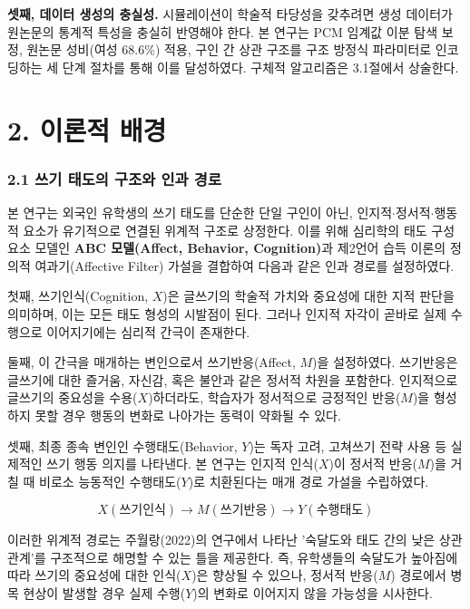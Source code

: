 \documentclass[a4paper,10pt]{oblivoir}
\begin{document}
\textbf{셋째, 데이터 생성의 충실성.} 시뮬레이션이 학술적 타당성을 갖추려면 생성 데이터가 원논문의 통계적 특성을 충실히 반영해야 한다. 본 연구는 PCM 임계값 이분 탐색 보정, 원논문 성비(여성 68.6\%) 적용, 구인 간 상관 구조를 구조 방정식 파라미터로 인코딩하는 세 단계 절차를 통해 이를 달성하였다. 구체적 알고리즘은 3.1절에서 상술한다.


\section{2. 이론적 배경}

\subsubsection{2.1 쓰기 태도의 구조와 인과 경로}

본 연구는 외국인 유학생의 쓰기 태도를 단순한 단일 구인이 아닌, 인지적\ensuremath{\cdot}정서적\ensuremath{\cdot}행동적 요소가 유기적으로 연결된 위계적 구조로 상정한다. 이를 위해 심리학의 태도 구성 요소 모델인 \textbf{ABC 모델(Affect, Behavior, Cognition)}과 제2언어 습득 이론의 정의적 여과기(Affective Filter) 가설을 결합하여 다음과 같은 인과 경로를 설정하였다.

첫째, 쓰기인식(Cognition, $X$)은 글쓰기의 학술적 가치와 중요성에 대한 지적 판단을 의미하며, 이는 모든 태도 형성의 시발점이 된다. 그러나 인지적 자각이 곧바로 실제 수행으로 이어지기에는 심리적 간극이 존재한다.

둘째, 이 간극을 매개하는 변인으로서 쓰기반응(Affect, $M$)을 설정하였다. 쓰기반응은 글쓰기에 대한 즐거움, 자신감, 혹은 불안과 같은 정서적 차원을 포함한다. 인지적으로 글쓰기의 중요성을 수용($X$)하더라도, 학습자가 정서적으로 긍정적인 반응($M$)을 형성하지 못할 경우 행동의 변화로 나아가는 동력이 약화될 수 있다.

셋째, 최종 종속 변인인 수행태도(Behavior, $Y$)는 독자 고려, 고쳐쓰기 전략 사용 등 실제적인 쓰기 행동 의지를 나타낸다. 본 연구는 인지적 인식($X$)이 정서적 반응($M$)을 거칠 때 비로소 능동적인 수행태도($Y$)로 치환된다는 매개 경로 가설을 수립하였다.

\[ X(\text{쓰기인식}) \rightarrow M(\text{쓰기반응}) \rightarrow Y(\text{수행태도}) \]

이러한 위계적 경로는 주월랑(2022)의 연구에서 나타난 '숙달도와 태도 간의 낮은 상관관계'를 구조적으로 해명할 수 있는 틀을 제공한다. 즉, 유학생들의 숙달도가 높아짐에 따라 쓰기의 중요성에 대한 인식($X$)은 향상될 수 있으나, 정서적 반응($M$) 경로에서 병목 현상이 발생할 경우 실제 수행($Y$)의 변화로 이어지지 않을 가능성을 시사한다.
\end{document}
